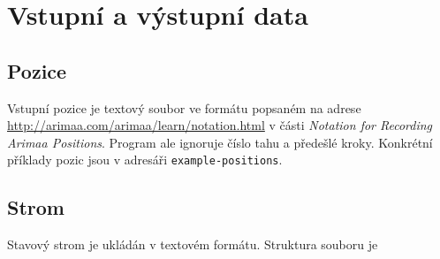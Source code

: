 \documentclass{article}
\begin{document}
\section{Vstupní a výstupní data}
\subsection{Pozice}
Vstupní pozice je textový soubor ve formátu popsaném na adrese
\url{http://arimaa.com/arimaa/learn/notation.html} v části 
\emph{Notation for Recording Arimaa Positions}. Program ale ignoruje číslo tahu 
a předešlé kroky. Konkrétní příklady pozic jsou v adresáři 
\texttt{example-positions}.

\subsection{Strom}
Stavový strom je ukládán v textovém formátu. Struktura souboru je
\end{document}
